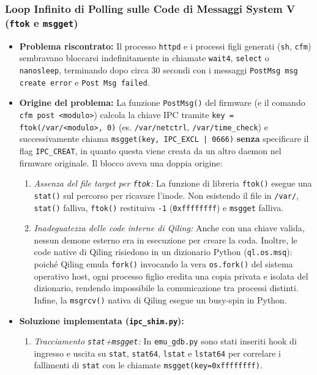 \documentclass[11pt,a4paper]{article}
\begin{document}
\subsubsection{Loop Infinito di Polling sulle Code di Messaggi System V (\texttt{ftok} e \texttt{msgget})}
\begin{itemize}
    \item \textbf{Problema riscontrato:} Il processo \texttt{httpd} e i processi figli generati (\texttt{sh}, \texttt{cfm}) sembravano bloccarsi indefinitamente in chiamate \texttt{wait4}, \texttt{select} o \texttt{nanosleep}, terminando dopo circa 30 secondi con i messaggi \texttt{PostMsg msg create error} e \texttt{Post Msg failed}.
    \item \textbf{Origine del problema:} La funzione \texttt{PostMsg()} del firmware (e il comando \texttt{cfm post <modulo>}) calcola la chiave IPC tramite \texttt{key = ftok(\textquotedbl/var/<modulo>\textquotedbl, 0)} (es. \texttt{/var/netctrl}, \texttt{/var/time\_check}) e successivamente chiama \texttt{msgget(key, IPC\_EXCL | 0666)} \textbf{senza} specificare il flag \texttt{IPC\_CREAT}, in quanto questa viene creata da un altro daemon nel firmware originale. Il blocco aveva una doppia origine:
    \begin{enumerate}
        \item \textit{Assenza del file target per \texttt{ftok}:} La funzione di libreria \texttt{ftok()} esegue una \texttt{stat()} sul percorso per ricavare l'inode. Non esistendo il file in \texttt{/var/}, \texttt{stat()} falliva, \texttt{ftok()} restituiva \texttt{-1} (\texttt{0xffffffff}) e \texttt{msgget} falliva.
        \item \textit{Inadeguatezza delle code interne di Qiling:} Anche con una chiave valida, nessun demone esterno era in esecuzione per creare la coda. Inoltre, le code native di Qiling risiedono in un dizionario Python (\texttt{ql.os.msq}): poiché Qiling emula \texttt{fork()} invocando la vera \texttt{os.fork()} del sistema operativo host, ogni processo figlio eredita una copia privata e isolata del dizionario, rendendo impossibile la comunicazione tra processi distinti. Infine, la \texttt{msgrcv()} nativa di Qiling esegue un busy-spin in Python.
    \end{enumerate}
    \item \textbf{Soluzione implementata (\texttt{ipc\_shim.py}):}
    \begin{enumerate}
        \item \textit{Tracciamento \texttt{stat}+\texttt{msgget}:} In \texttt{emu\_gdb.py} sono stati inseriti hook di ingresso e uscita su \texttt{stat}, \texttt{stat64}, \texttt{lstat} e \texttt{lstat64} per correlare i fallimenti di \texttt{stat} con le chiamate \texttt{msgget(key=0xffffffff)}.

\end{enumerate}
\end{itemize}
\end{document}
